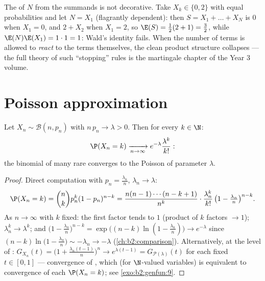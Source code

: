 \begin{remark}
The  of $N$ from the summands is not decorative.
Take $X_k \in \{0, 2\}$ with equal probabilities and let $N =
X_1$ (flagrantly dependent): then $S = X_1 + \dots + X_N$ is
$0$ when $X_1 = 0$, and $2 + X_2$ when $X_1 = 2$, so $\E(S) =
\frac12(2 + 1) = \frac32$, while $\E(N)\E(X_1) = 1\cdot1 =
1$: Wald's identity fails. When the number of terms is
allowed to \emph{react} to the terms themselves, the clean
product structure collapses --- the full theory of such
``stopping'' rules is the martingale chapter of the Year 3
volume.
\end{remark}

\section{Poisson approximation}

\begin{theorem}\label{thm:b2:genfun:rareevents}
Let $X_n \sim \mathcal{B}(n, p_n)$ with $n\,p_n \to \lambda > 0$.
Then for every $k \in \N$:
\[
\P(X_n = k)
\xrightarrow[n\to\infty]{}
e^{-\lambda}\frac{\lambda^k}{k!} :
\]
the binomial  of many rare  converges to the
Poisson  of parameter $\lambda$.
\end{theorem}

\begin{proof}
Direct computation with $p_n = \frac{\lambda_n}{n}$, $\lambda_n
\to \lambda$:
\[
\P(X_n = k)
= \binom nk p_n^k(1 - p_n)^{n-k}
= \frac{n(n-1)\cdots(n-k+1)}{n^k}\cdot
\frac{\lambda_n^k}{k!}\,
\bigl(1 - \tfrac{\lambda_n}{n}\bigr)^{n-k} .
\]
As $n \to \infty$ with $k$ fixed: the first factor tends to $1$
(product of $k$ factors $\to 1$); $\lambda_n^k \to \lambda^k$;
and $\bigl(1 - \frac{\lambda_n}{n}\bigr)^{n-k} =
\exp\bigl((n-k)\ln(1 - \frac{\lambda_n}{n})\bigr) \to
e^{-\lambda}$ since $(n - k)\ln\bigl(1 - \frac{\lambda_n}{n}\bigr)
\sim -\lambda_n \to -\lambda$
(\cref{ch:b2:comparison}). Alternatively, at the level of
: $G_{X_n}(t) = \bigl(1 +
\frac{\lambda_n(t-1)}{n}\bigr)^n \to e^{\lambda(t - 1)} =
G_{\mathcal{P}(\lambda)}(t)$ for each fixed $t \in [0, 1]$ ---
convergence of , which (for $\N$-valued
variables) is equivalent to convergence of each $\P(X_n = k)$;
see \cref{exo:b2:genfun:9}.
\end{proof}

